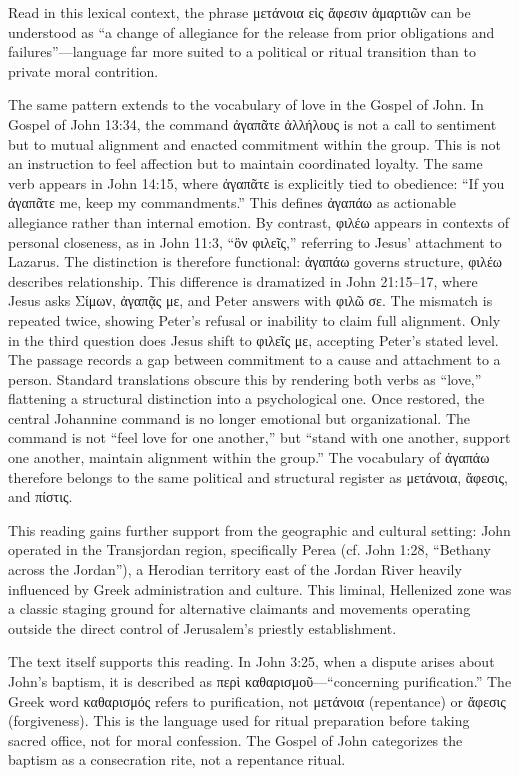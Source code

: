 Read in this lexical context, the phrase μετάνοια εἰς ἄφεσιν ἁμαρτιῶν can be understood as ``a change of allegiance for the release from prior obligations and failures''---language far more suited to a political or ritual transition than to private moral contrition.

The same pattern extends to the vocabulary of love in the Gospel of John.
In Gospel of John 13:34, the command ἀγαπᾶτε ἀλλήλους is not a call to sentiment but to mutual alignment and enacted commitment within the group.
This is not an instruction to feel affection but to maintain coordinated loyalty.
The same verb appears in John 14:15, where ἀγαπᾶτε is explicitly tied to obedience: ``If you ἀγαπᾶτε me, keep my commandments.''
This defines ἀγαπάω as actionable allegiance rather than internal emotion.
By contrast, φιλέω appears in contexts of personal closeness, as in John 11:3, ``ὃν φιλεῖς,'' referring to Jesus' attachment to Lazarus.
The distinction is therefore functional: ἀγαπάω governs structure, φιλέω describes relationship.
This difference is dramatized in John 21:15--17, where Jesus asks Σίμων, ἀγαπᾷς με, and Peter answers with φιλῶ σε.
The mismatch is repeated twice, showing Peter's refusal or inability to claim full alignment.
Only in the third question does Jesus shift to φιλεῖς με, accepting Peter's stated level.
The passage records a gap between commitment to a cause and attachment to a person.
Standard translations obscure this by rendering both verbs as ``love,'' flattening a structural distinction into a psychological one.
Once restored, the central Johannine command is no longer emotional but organizational.
The command is not ``feel love for one another,'' but ``stand with one another, support one another, maintain alignment within the group.''
The vocabulary of ἀγαπάω therefore belongs to the same political and structural register as μετάνοια, ἄφεσις, and πίστις.

This reading gains further support from the geographic and cultural setting: John operated in the Transjordan region, specifically Perea (cf. John 1:28, ``Bethany across the Jordan''), a Herodian territory east of the Jordan River heavily influenced by Greek administration and culture.
This liminal, Hellenized zone was a classic staging ground for alternative claimants and movements operating outside the direct control of Jerusalem's priestly establishment.

The text itself supports this reading.
In John 3:25, when a dispute arises about John's baptism, it is described as περὶ καθαρισμοῦ---``concerning purification.''
The Greek word καθαρισμός refers to purification, not μετάνοια (repentance) or ἄφεσις (forgiveness).
This is the language used for ritual preparation before taking sacred office, not for moral confession.
The Gospel of John categorizes the baptism as a consecration rite, not a repentance ritual.


